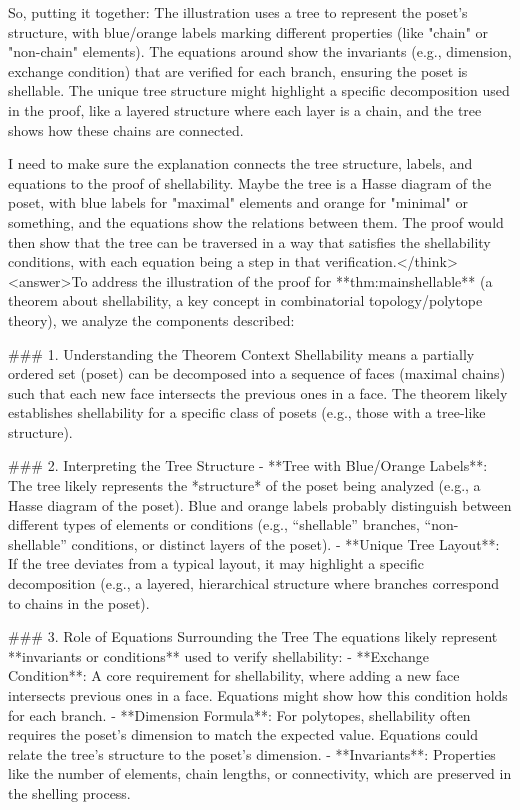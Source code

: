 So, putting it together: The illustration uses a tree to represent the poset's structure, with blue/orange labels marking different properties (like "chain" or "non-chain" elements). The equations around show the invariants (e.g., dimension, exchange condition) that are verified for each branch, ensuring the poset is shellable. The unique tree structure might highlight a specific decomposition used in the proof, like a layered structure where each layer is a chain, and the tree shows how these chains are connected.

I need to make sure the explanation connects the tree structure, labels, and equations to the proof of shellability. Maybe the tree is a Hasse diagram of the poset, with blue labels for "maximal" elements and orange for "minimal" or something, and the equations show the relations between them. The proof would then show that the tree can be traversed in a way that satisfies the shellability conditions, with each equation being a step in that verification.</think><answer>To address the illustration of the proof for **thm:mainshellable** (a theorem about shellability, a key concept in combinatorial topology/polytope theory), we analyze the components described:  


### 1. Understanding the Theorem Context  
Shellability means a partially ordered set (poset) can be decomposed into a sequence of faces (maximal chains) such that each new face intersects the previous ones in a face. The theorem likely establishes shellability for a specific class of posets (e.g., those with a tree-like structure).  


### 2. Interpreting the Tree Structure  
- **Tree with Blue/Orange Labels**: The tree likely represents the *structure* of the poset being analyzed (e.g., a Hasse diagram of the poset). Blue and orange labels probably distinguish between different types of elements or conditions (e.g., “shellable” branches, “non-shellable” conditions, or distinct layers of the poset).  
- **Unique Tree Layout**: If the tree deviates from a typical layout, it may highlight a specific decomposition (e.g., a layered, hierarchical structure where branches correspond to chains in the poset).  


### 3. Role of Equations Surrounding the Tree  
The equations likely represent **invariants or conditions** used to verify shellability:  
- **Exchange Condition**: A core requirement for shellability, where adding a new face intersects previous ones in a face. Equations might show how this condition holds for each branch.  
- **Dimension Formula**: For polytopes, shellability often requires the poset’s dimension to match the expected value. Equations could relate the tree’s structure to the poset’s dimension.  
- **Invariants**: Properties like the number of elements, chain lengths, or connectivity, which are preserved in the shelling process.  


